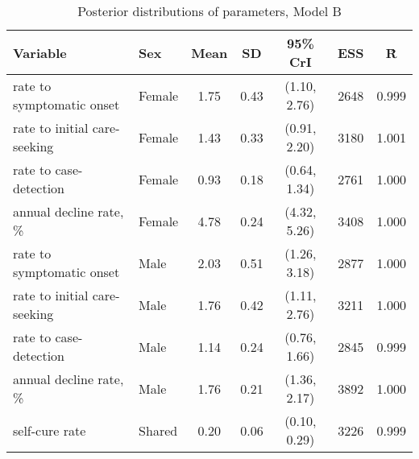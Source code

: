\begin{table}[h]

\caption{\label{tab:}Posterior distributions of parameters, Model B}
\centering
\begin{tabular}[t]{llccccc}
\toprule
Variable & Sex & Mean & SD & 95\% CrI & ESS & \^{R}\\
\midrule
rate to symptomatic onset & Female & 1.75 & 0.43 & (1.10, 2.76) & 2648 & 0.999\\
rate to initial care-seeking & Female & 1.43 & 0.33 & (0.91, 2.20) & 3180 & 1.001\\
rate to case-detection & Female & 0.93 & 0.18 & (0.64, 1.34) & 2761 & 1.000\\
annual decline rate, \% & Female & 4.78 & 0.24 & (4.32, 5.26) & 3408 & 1.000\\
\addlinespace
rate to symptomatic onset & Male & 2.03 & 0.51 & (1.26, 3.18) & 2877 & 1.000\\
rate to initial care-seeking & Male & 1.76 & 0.42 & (1.11, 2.76) & 3211 & 1.000\\
rate to case-detection & Male & 1.14 & 0.24 & (0.76, 1.66) & 2845 & 0.999\\
annual decline rate, \% & Male & 1.76 & 0.21 & (1.36, 2.17) & 3892 & 1.000\\
\addlinespace
self-cure rate & Shared & 0.20 & 0.06 & (0.10, 0.29) & 3226 & 0.999\\
\bottomrule
\end{tabular}
\end{table}
